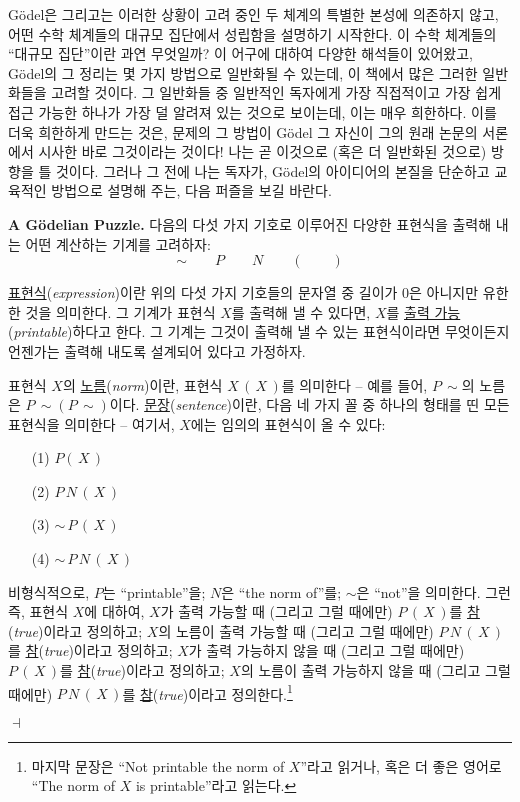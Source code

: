 \documentclass[12pt]{paper}
\newenvironment{context}[1][]{\noindent \textbf{{#1}.}}{\hfill $ \dashv $}
\begin{document}
  G\"odel은 그리고는 이러한 상황이 고려 중인 두 체계의 특별한 본성에 의존하지 않고,
  어떤 수학 체계들의 대규모 집단에서 성립함을 설명하기 시작한다.
  이 수학 체계들의 ``대규모 집단''이란 과연 무엇일까?
  이 어구에 대하여 다양한 해석들이 있어왔고,
  G\"odel의 그 정리는 몇 가지 방법으로 일반화될 수 있는데,
  이 책에서 많은 그러한 일반화들을 고려할 것이다.
  그 일반화들 중 일반적인 독자에게 가장 직접적이고 가장 쉽게 접근 가능한 하나가 가장 덜 알려져 있는 것으로 보이는데,
  이는 매우 희한하다.
  이를 더욱 희한하게 만드는 것은,
  문제의 그 방법이 G\"odel 그 자신이 그의 원래 논문의 서론에서 시사한 바로 그것이라는 것이다!
  나는 곧 이것으로 (혹은 더 일반화된 것으로) 방향을 틀 것이다.
  그러나 그 전에 나는 독자가,
  G\"odel의 아이디어의 본질을 단순하고 교육적인 방법으로 설명해 주는,
  다음 퍼즐을 보길 바란다.

  \begin{context}[A G\"odelian Puzzle]
    다음의 다섯 가지 기호로 이루어진 다양한 표현식을 출력해 내는 어떤 계산하는 기계를 고려하자:
    $$ \sim \qquad P \qquad N \qquad \left( \right. \qquad \left. \right) $$
    
    \underline{표현식}(\textit{expression})이란 위의 다섯 가지 기호들의 문자열 중 길이가 $0$은 아니지만 유한한 것을 의미한다.
    그 기계가 표현식 $X$를 출력해 낼 수 있다면,
    $X$를 \underline{출력 가능}(\textit{printable})하다고 한다.
    그 기계는 그것이 출력해 낼 수 있는 표현식이라면 무엇이든지 언젠가는 출력해 내도록 설계되어 있다고 가정하자.

    표현식 $X$의 \underline{노름}(\textit{norm})이란,
    표현식 $X \, \left( \, X \, \right)$를 의미한다 --
    예를 들어, $P \, \sim$의 노름은 $P \, \sim \left( P \, \sim \right)$이다.
    \underline{문장}(\textit{sentence})이란, 다음 네 가지 꼴 중 하나의 형태를 띤 모든 표현식을 의미한다 --
    여기서, $X$에는 임의의 표현식이 올 수 있다:
    \begin{itemize}
      \item[(1)] $P \left( \, X \, \right)$
      \item[(2)] $P \, N \, \left( \, X \, \right)$
      \item[(3)] $\sim \, P \, \left( \, X \, \right)$
      \item[(4)] $\sim \, P \, N \, \left( \, X \, \right)$   
    \end{itemize}

    비형식적으로, $P$는 ``printable''을; $N$은 ``the norm of''를; $\sim$은 ``not''을 의미한다.
    그런즉, 표현식 $X$에 대하여,
    $X$가 출력 가능할 때 (그리고 그럴 때에만) $P \, \left( \, X \, \right)$를 \underline{참}(\textit{true})이라고 정의하고;
    $X$의 노름이 출력 가능할 때 (그리고 그럴 때에만) $P \, N \, \left( \, X \, \right)$를 \underline{참}(\textit{true})이라고 정의하고;
    $X$가 출력 가능하지 않을 때 (그리고 그럴 때에만) $P \, \left( \, X \, \right)$를 \underline{참}(\textit{true})이라고 정의하고;
    $X$의 노름이 출력 가능하지 않을 때 (그리고 그럴 때에만) $P \, N \, \left( \, X \, \right)$를 \underline{참}(\textit{true})이라고 정의한다.\footnote
    {
      마지막 문장은 ``Not printable the norm of $X$''라고 읽거나,
      혹은 더 좋은 영어로 ``The norm of $X$ is printable''라고 읽는다.
    }


\end{context}
\end{document}
